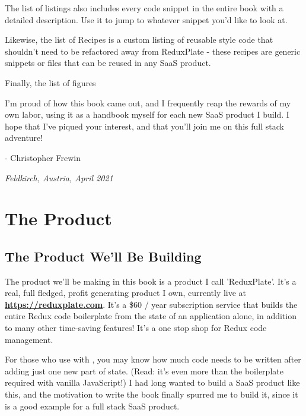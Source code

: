 \documentclass[paper=6in:9in,pagesize=pdftex,headinclude=on,footinclude=on,12pt]{scrbook}
\newcommand{\link}[2]{\textbf{\textcolor{monokaiPink}{\href{#2}{#1}}}}
\begin{document}
The list of listings also includes every code snippet in the entire book with a detailed description. Use it to jump to whatever snippet you'd like to look at.

Likewise, the list of Recipes is a custom listing of reusable style code that shouldn't need to be refactored away from ReduxPlate - these recipes are generic snippets or files that can be reused in any SaaS product.

Finally, the list of figures


I'm proud of how this book came out, and I frequently reap the rewards of my own labor, using it as a handbook myself for each new SaaS product I build. I hope that I've piqued your interest, and that you'll join me on this full stack adventure!

- Christopher Frewin

\textit{Feldkirch, Austria, April 2021}

\chapter{The Product}

\section{The Product We'll Be Building}

The product we'll be making in this book is a product I call 'ReduxPlate'. It's a real, full fledged, profit generating product I own, currently live at \link{https://reduxplate.com}{https://reduxplate.com}. It's a \$60 / year subscription service that builds the entire Redux code boilerplate from the state of an application alone, in addition to many other time-saving features!  It's a one stop shop for Redux code management.

For those who use  with , you may know how much code needs to be written after adding just one new part of state. (Read: it's even more than the boilerplate required with vanilla JavaScript!) I had long wanted to build a SaaS product like this, and the motivation to write the book finally spurred me to build it, since it is a good example for a full stack SaaS product. 
\end{document}
